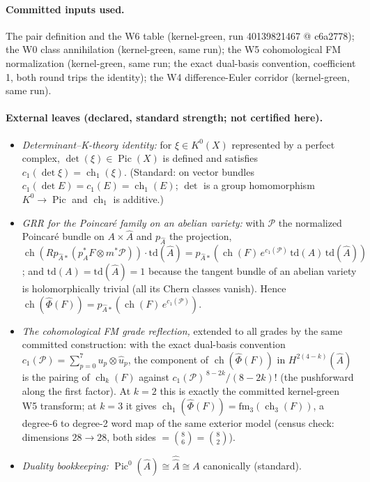 \documentclass[11pt]{article}
\newcommand{\ch}{\operatorname{ch}}
\newcommand{\Pic}{\operatorname{Pic}}
\newcommand{\KA}{A}
\newcommand{\KAd}{\widehat{A}}
\begin{document}
\paragraph{Committed inputs used.} The pair definition and the W6 table
(kernel-green, run 40139821467 @ c6a2778); the W0 class annihilation
(kernel-green, same run); the W5 cohomological FM normalization
(kernel-green, same run; the exact dual-basis convention, coefficient 1,
both round trips the identity); the W4 difference-Euler corridor
(kernel-green, same run).

\paragraph{External leaves (declared, standard strength; not certified
here).}
\begin{itemize}
\item[P1] \emph{Determinant--K-theory identity:} for $\xi \in K^0(X)$
represented by a perfect complex, $\det(\xi) \in \Pic(X)$ is defined and
satisfies $c_1(\det \xi) = \ch_1(\xi)$. (Standard: on vector bundles
$c_1(\det E) = c_1(E) = \ch_1(E)$; $\det$ is a group homomorphism
$K^0 \to \Pic$ and $\ch_1$ is additive.)
\item[P2] \emph{GRR for the Poincar\'e family on an abelian variety:}
with $\mathcal{P}$ the normalized Poincar\'e bundle on $\KA\times\KAd$ and
$p_{\KAd}$ the projection,
$\ch(Rp_{\KAd *}(p_\KA^*F\otimes m^*\mathcal{P}))\cdot \mathrm{td}(\KAd)
= p_{\KAd *}(\ch(F)\, e^{c_1(\mathcal{P})}\,\mathrm{td}(\KA)\,
\mathrm{td}(\KAd))$; and $\mathrm{td}(\KA) = \mathrm{td}(\KAd) = 1$
because the tangent bundle of an abelian variety is holomorphically
trivial (all its Chern classes vanish). Hence
$\ch(\widehat{\Phi}(F)) = p_{\KAd *}(\ch(F)\, e^{c_1(\mathcal{P})})$.
\item[P3] \emph{The cohomological FM grade reflection,} extended to all
grades by the same committed construction: with the exact dual-basis
convention $c_1(\mathcal{P}) = \sum_{p=0}^{7} u_p \otimes \widehat u_p$,
the component of $\ch(\widehat\Phi(F))$ in $H^{2(4-k)}(\KAd)$ is the
pairing of $\ch_k(F)$ against $c_1(\mathcal{P})^{\,8-2k}/(8-2k)!$
(the pushforward along the first factor). At $k=2$ this is exactly the
committed kernel-green W5 transform; at $k=3$ it gives
$\ch_1(\widehat\Phi(F)) = \mathrm{fm}_3(\ch_3(F))$, a degree-6 to
degree-2 word map of the same exterior model (census check: dimensions
$28 \to 28$, both sides $=\binom{8}{6}=\binom{8}{2}$).
\item[P4] \emph{Duality bookkeeping:} $\Pic^0(\KAd) \cong
\widehat{\widehat{A}} \cong \KA$ canonically (standard).
\end{itemize}
\end{document}
